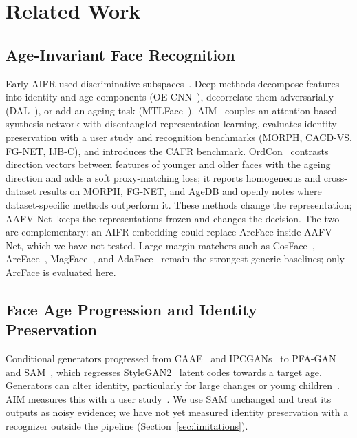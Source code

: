 \documentclass[journal]{IEEEtran}
\newcommand{\sys}{AAFV-Net}
\begin{document}
\section{Related Work}
\label{sec:related}

\subsection{Age-Invariant Face Recognition}
Early AIFR used discriminative subspaces~\cite{li2011aifr}. Deep methods decompose features into identity and age components (OE-CNN~\cite{wang2018oecnn}), decorrelate them adversarially (DAL~\cite{wang2019dal}), or add an ageing task (MTLFace~\cite{huang2021mtlface}). AIM~\cite{zhao2022aim} couples an attention-based synthesis network with disentangled representation learning, evaluates identity preservation with a user study and recognition benchmarks (MORPH, CACD-VS, FG-NET, IJB-C), and introduces the CAFR benchmark. OrdCon~\cite{wang2025ordcon} contrasts direction vectors between features of younger and older faces with the ageing direction and adds a soft proxy-matching loss; it reports homogeneous and cross-dataset results on MORPH, FG-NET, and AgeDB and openly notes where dataset-specific methods outperform it. These methods change the representation; \sys\ keeps the representations frozen and changes the decision. The two are complementary: an AIFR embedding could replace ArcFace inside \sys, which we have not tested. Large-margin matchers such as CosFace~\cite{wang2018cosface}, ArcFace~\cite{deng2019arcface}, MagFace~\cite{meng2021magface}, and AdaFace~\cite{kim2022adaface} remain the strongest generic baselines; only ArcFace is evaluated here.

\subsection{Face Age Progression and Identity Preservation}
Conditional generators progressed from CAAE~\cite{zhang2017caae} and IPCGANs~\cite{tang2018ipcgan} to PFA-GAN~\cite{huang2021pfagan} and SAM~\cite{alaluf2021sam}, which regresses StyleGAN2~\cite{karras2020stylegan2} latent codes towards a target age. Generators can alter identity, particularly for large changes or young children~\cite{deb2018child}. AIM measures this with a user study~\cite{zhao2022aim}. We use SAM unchanged and treat its outputs as noisy evidence; we have not yet measured identity preservation with a recognizer outside the pipeline (Section~\ref{sec:limitations}).
\end{document}
